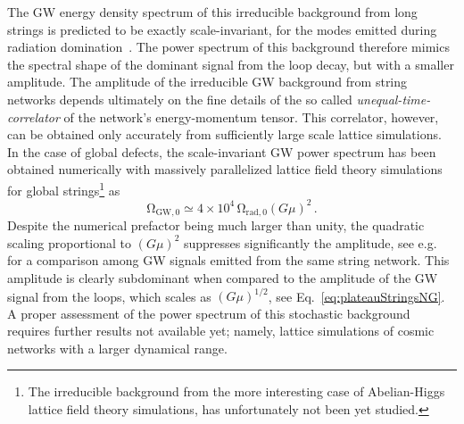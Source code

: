 \documentclass[11pt,a4paper]{article}
\begin{document}
The GW energy density spectrum of this irreducible background from long strings is predicted to be exactly scale-invariant, for the modes emitted during radiation domination~\cite{Figueroa:2012kw}. The power spectrum of this background therefore mimics the spectral shape of the dominant signal from the loop decay, but with a smaller amplitude. The amplitude of the irreducible GW background from string networks depends ultimately on the fine details of the so called \textit{unequal-time-correlator} of the network's energy-momentum tensor. This correlator, however, can be obtained only  accurately from sufficiently large scale lattice simulations. In the case of global defects, the scale-invariant GW power spectrum has been obtained numerically with massively parallelized lattice field theory simulations for global strings\footnote{The irreducible background from the more interesting case of Abelian-Higgs lattice field theory simulations, has unfortunately not been yet studied.} as~\cite{Figueroa:2012kw}
\begin{equation}\label{eq:GWSOSFplateau}
    \mathrm{\Omega}_{\text{GW}, 0}\simeq 4\times 10^4\, \mathrm{\Omega}_{\text{rad},0} (G\mu)^2\,.
\end{equation}
Despite the numerical prefactor being much larger than unity, the quadratic scaling proportional to $(G\mu)^2$ suppresses significantly the amplitude, see e.g.~\cite{Buchmuller:2013lra} for a comparison among GW signals emitted from the same string network. This amplitude is clearly subdominant when compared to the amplitude of the GW signal from the loops, which scales as $(G\mu)^{1/2}$,  see Eq.~\eqref{eq:plateauStringsNG}. A proper assessment of the power spectrum of this stochastic background requires further results not available yet; namely, lattice simulations of cosmic networks with a larger dynamical range.
\end{document}

